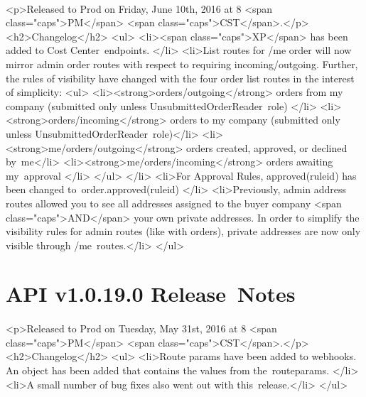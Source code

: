 \documentclass{memoir}%
\begin{document}
\paragraph*{}%
<p>Released to Prod on Friday, June 10th, 2016 at 8 <span class="caps">PM</span> <span class="caps">CST</span>.</p>\newline%
<h2>Changelog</h2>\newline%
<ul>\newline%
<li><span class="caps">XP</span> has been added to Cost Center~endpoints. </li>\newline%
<li>List routes for /me order will now mirror admin order routes with respect to requiring incoming/outgoing. Further, the rules of visibility have changed with the four order list routes in the interest of simplicity: <ul>\newline%
<li><strong>orders/outgoing</strong> orders from my company (submitted only unless UnsubmittedOrderReader~role) </li>\newline%
<li><strong>orders/incoming</strong> orders to my company (submitted only unless UnsubmittedOrderReader~role)</li>\newline%
<li><strong>me/orders/outgoing</strong> orders created, approved, or declined by~me</li>\newline%
<li><strong>me/orders/incoming</strong> orders awaiting my~approval </li>\newline%
</ul>\newline%
</li>\newline%
<li>For Approval Rules, approved(ruleid) has been changed to~order.approved(ruleid) </li>\newline%
<li>Previously, admin address routes allowed you to see all addresses assigned to the buyer company <span class="caps">AND</span> your own private addresses. In order to simplify the visibility rules for admin routes (like with orders), private addresses are now only visible through /me~routes.</li>\newline%
</ul>

%
\section*{API v1.0.19.0 Release~Notes}%
\paragraph*{}%

%
\paragraph*{}%
<p>Released to Prod on Tuesday, May 31st, 2016 at 8 <span class="caps">PM</span> <span class="caps">CST</span>.</p>\newline%
<h2>Changelog</h2>\newline%
<ul>\newline%
<li>Route params have been added to webhooks. An object has been added that contains the values from the~routeparams. </li>\newline%
<li>A small number of bug fixes also went out with this~release.</li>\newline%
</ul>
\end{document}
